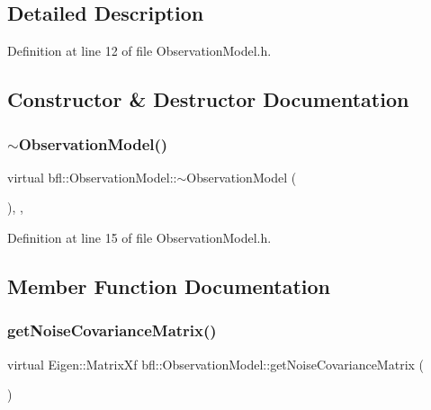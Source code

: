 \subsection{Detailed Description}


Definition at line 12 of file Observation\+Model.\+h.



\subsection{Constructor \& Destructor Documentation}
\mbox{\label{classbfl_1_1ObservationModel_ab4033bc78992bb350c9102f5e9d2fbc9}} 
\subsubsection{\texorpdfstring{$\sim$\+Observation\+Model()}{~ObservationModel()}}
{\footnotesize\ttfamily virtual bfl\+::\+Observation\+Model\+::$\sim$\+Observation\+Model (\begin{DoxyParamCaption}{ }\end{DoxyParamCaption})\hspace{0.3cm}{\ttfamily [inline]}, {\ttfamily [virtual]}, {\ttfamily [noexcept]}}



Definition at line 15 of file Observation\+Model.\+h.



\subsection{Member Function Documentation}
\mbox{\label{classbfl_1_1ObservationModel_a63357b1456a4a5387e55d31ddb0b9b50}} 
\subsubsection{\texorpdfstring{get\+Noise\+Covariance\+Matrix()}{getNoiseCovarianceMatrix()}}
{\footnotesize\ttfamily virtual Eigen\+::\+Matrix\+Xf bfl\+::\+Observation\+Model\+::get\+Noise\+Covariance\+Matrix (\begin{DoxyParamCaption}{ }\end{DoxyParamCaption})\hspace{0.3cm}{\ttfamily [pure virtual]}}



